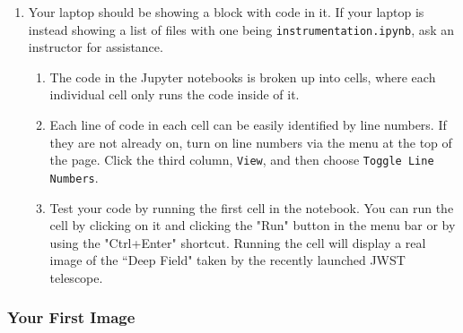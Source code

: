 \documentclass[14pt]{article}
\begin{document}
\begin{enumerate}
    \item Your laptop should be showing a block with code in it. If your laptop is instead showing a list of files with one being \texttt{instrumentation.ipynb}, ask an instructor for assistance.
        \begin{enumerate}
        \item The code in the Jupyter notebooks is broken up into cells, where each individual cell only runs the code inside of it.
        \item Each line of code in each cell can be easily identified by line numbers. If they are not already on, turn on line numbers via the menu at the top of the page. Click the third column, \texttt{View}, and then choose \texttt{Toggle Line Numbers}.
        \item Test your code by running the first cell in the notebook. You can run the cell by clicking on it and clicking the "Run" button in the menu bar or by using the "Ctrl+Enter" shortcut. Running the cell will display a real image of the ``Deep Field" taken by the recently launched JWST telescope.
        \end{enumerate}
\end{enumerate}

\subsubsection{Your First Image}
\end{document}
